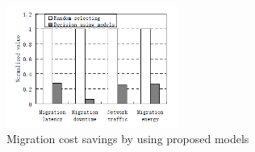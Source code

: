 \begin{figure}[htbp]
	\centering
		\includegraphics[width=0.5\textwidth]{figures/state_of_the_art/vm_migration_normalized_cost.PNG}
	\caption{Migration cost savings by using proposed models \cite{liu2013performance}}
	\label{fig:vm_migration_normalized_cost}
\end{figure}














%


